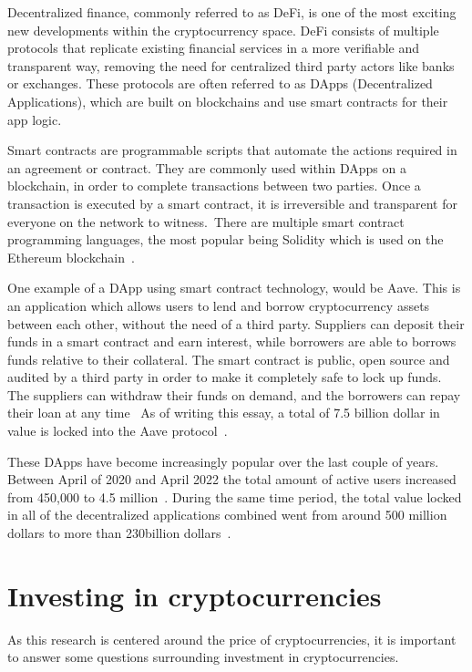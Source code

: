 Decentralized finance, commonly referred to as DeFi, is one of the most exciting new developments within the cryptocurrency space. DeFi consists of multiple protocols that replicate existing financial services in a more verifiable and transparent way, removing the need for centralized third party actors like banks or exchanges. These protocols are often referred to as DApps (Decentralized Applications), which are built on blockchains and use smart contracts for their app logic.~\autocite{Schaer2021}\bigbreak

Smart contracts are programmable scripts that automate the actions required in an agreement or contract. They are commonly used within DApps on a blockchain, in order to complete transactions between two parties. Once a transaction is executed by a smart contract, it is irreversible and transparent for everyone on the network to witness.~\autocite{Schaer2021}There are multiple smart contract programming languages, the most popular being Solidity which is used on the Ethereum blockchain~\autocite{Chirag2022}.\bigbreak

One example of a DApp using smart contract technology, would be Aave. This is an application which allows users to lend and borrow cryptocurrency assets between each other, without the need of a third party. Suppliers can deposit their funds in a smart contract and earn interest, while borrowers are able to borrows funds relative to their collateral. The smart contract is public, open source and audited by a third party in order to make it completely safe to lock up funds. The suppliers can withdraw their funds on demand, and the borrowers can repay their loan at any time~\autocite{Boado2020} As of writing this essay, a total of 7.5 billion dollar in value is locked into the Aave protocol~\autocite{Aave}.\bigbreak

These DApps have become increasingly popular over the last couple of years. Between April of 2020 and April 2022 the total amount of active users increased from 450,000 to 4.5 million~\autocite{Chen2022}. During the same time period, the total value locked in all of the decentralized applications combined went from around 500 million dollars to more than 230billion dollars~\autocite{Matsuoka2022}. \bigbreak 

\section{Investing in cryptocurrencies}

As this research is centered around the price of cryptocurrencies, it is important to answer some questions surrounding investment in cryptocurrencies. \bigbreak

